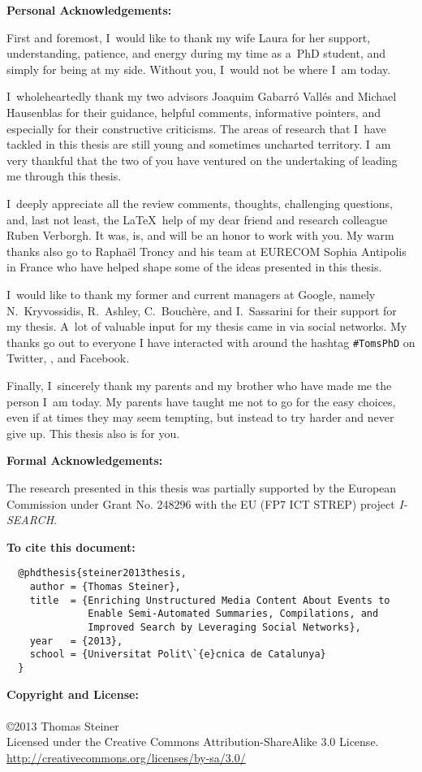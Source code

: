 \begin{acknowledgements}

\textbf{Personal Acknowledgements:}

First and foremost, I~would like to thank my wife Laura
for her support, understanding, patience, and energy
during my time as a~PhD student, and simply for being at my side.
Without you, I~would not be where I~am today.

I~wholeheartedly thank my two advisors Joaquim Gabarró Vallés
and Michael Hausenblas for their guidance, helpful comments,
informative pointers, and especially
for their constructive criticisms.
The areas of research that I~have tackled in this thesis
are still young and sometimes uncharted territory.
I~am very thankful that the two of you have ventured
on the undertaking of leading me through this thesis.

I~deeply appreciate all the review comments, thoughts, challenging questions,
and, last not least, the \LaTeX~help of my dear friend
and research colleague Ruben Verborgh.
It was, is, and will be an honor to work with you.
My warm thanks also go to Raphaël Troncy and his team
at \mbox{EURECOM} Sophia Antipolis in France
who have helped shape some of the ideas presented in this thesis.

I~would like to thank my former and current managers at Google,
namely N.~Kryvossidis, R.~Ashley, C.~Bouchère, and I.~Sassarini
for their support for my thesis.
A~lot of valuable input for my thesis came in via social networks.
My thanks go out to everyone I have interacted with
around the hashtag \texttt{\#TomsPhD}
on Twitter, \googleplus, and Facebook.

Finally, I~sincerely thank my parents and my brother
who have made me the person I~am today.
My parents have taught me
not to go for the easy choices, even
if at times they may seem tempting,
but instead to try harder and never give up.
This thesis also is for you.

\textbf{Formal Acknowledgements:}

The research presented in this thesis
was partially supported by the European Commission
under Grant No. 248296 with the EU (FP7 ICT STREP)
project \mbox{\emph{I-SEARCH}}.

\vspace{80mm}

\textbf{To cite this document:}

\small
\begin{verbatim}
  @phdthesis{steiner2013thesis,
    author = {Thomas Steiner},
    title  = {Enriching Unstructured Media Content About Events to
              Enable Semi-Automated Summaries, Compilations, and
              Improved Search by Leveraging Social Networks},
    year   = {2013},
    school = {Universitat Polit\`{e}cnica de Catalunya}
  }
\end{verbatim}

\normalsize

\vspace{10mm}
\textbf{Copyright and License:}\\\\
\small \copyright \normalsize 2013 Thomas Steiner\\
Licensed under the Creative Commons Attribution-ShareAlike 3.0 License.\\
\url{http://creativecommons.org/licenses/by-sa/3.0/}

\end{acknowledgements}
